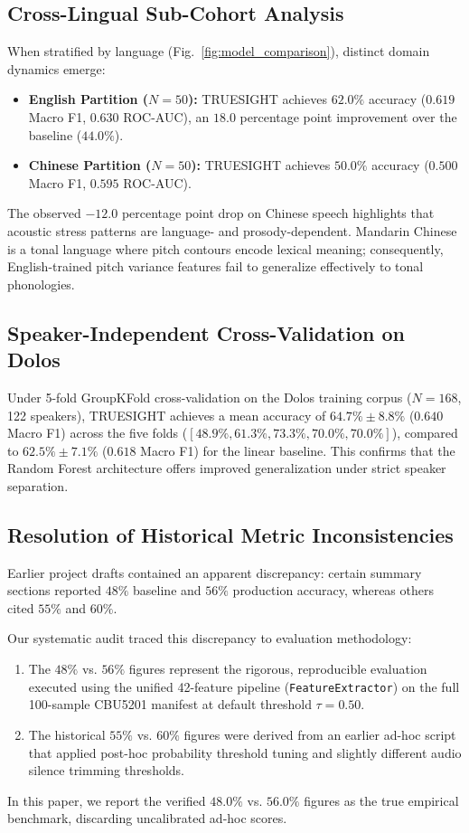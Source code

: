 \documentclass[conference]{IEEEtran}
\begin{document}
\subsection{Cross-Lingual Sub-Cohort Analysis}
When stratified by language (Fig.~\ref{fig:model_comparison}), distinct domain dynamics emerge:
\begin{itemize}
    \item \textbf{English Partition ($N=50$):} TRUESIGHT achieves $62.0\%$ accuracy ($0.619$ Macro F1, $0.630$ ROC-AUC), an $18.0$ percentage point improvement over the baseline ($44.0\%$).
    \item \textbf{Chinese Partition ($N=50$):} TRUESIGHT achieves $50.0\%$ accuracy ($0.500$ Macro F1, $0.595$ ROC-AUC).
\end{itemize}
The observed $-12.0$ percentage point drop on Chinese speech highlights that acoustic stress patterns are language- and prosody-dependent. Mandarin Chinese is a tonal language where pitch contours encode lexical meaning; consequently, English-trained pitch variance features fail to generalize effectively to tonal phonologies.

\subsection{Speaker-Independent Cross-Validation on Dolos}
Under 5-fold GroupKFold cross-validation on the Dolos training corpus ($N=168$, 122 speakers), TRUESIGHT achieves a mean accuracy of $64.7\% \pm 8.8\%$ ($0.640$ Macro F1) across the five folds ($[48.9\%, 61.3\%, 73.3\%, 70.0\%, 70.0\%]$), compared to $62.5\% \pm 7.1\%$ ($0.618$ Macro F1) for the linear baseline. This confirms that the Random Forest architecture offers improved generalization under strict speaker separation.

\subsection{Resolution of Historical Metric Inconsistencies}
Earlier project drafts contained an apparent discrepancy: certain summary sections reported $48\%$ baseline and $56\%$ production accuracy, whereas others cited $55\%$ and $60\%$.

Our systematic audit traced this discrepancy to evaluation methodology:
\begin{enumerate}
    \item The $48\%$ vs. $56\%$ figures represent the rigorous, reproducible evaluation executed using the unified 42-feature pipeline (\texttt{FeatureExtractor}) on the full 100-sample CBU5201 manifest at default threshold $\tau = 0.50$.
    \item The historical $55\%$ vs. $60\%$ figures were derived from an earlier ad-hoc script that applied post-hoc probability threshold tuning and slightly different audio silence trimming thresholds.
\end{enumerate}
In this paper, we report the verified $48.0\%$ vs. $56.0\%$ figures as the true empirical benchmark, discarding uncalibrated ad-hoc scores.
\end{document}
